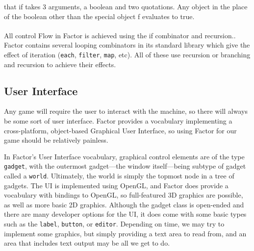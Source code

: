 \documentclass{sig-alternate}
\begin{document}
     that if takes 3 arguments, a boolean and two quotations. Any object in the place of the boolean other
      than the special object f evaluates to true.
\\\\
All control Flow in Factor is achieved using the if combinator and recursion.. 
Factor contains several looping combinators in its standard library which give the effect of iteration (\texttt{each}, \texttt{filter}, \texttt{map}, etc). All of these use recursion or branching
  and recursion to achieve their effects.
  
\subsection{User Interface}
Any game will require the user to interact with the machine, so there will always be some sort of user interface. Factor provides a vocabulary implementing a cross-platform, object-based Graphical User Interface, so using Factor for our game should be relatively painless.

In Factor's User Interface vocabulary, graphical control elements are of the type \texttt{gadget}, with the outermost gadget---the window itself---being subtype of gadget called a \texttt{world}. Ultimately, the world is simply the topmost node in a tree of gadgets. The UI is implemented using OpenGL, and Factor does provide a vocabulary with bindings to OpenGL, so full-featured 3D graphics are possible, as well as more basic 2D graphics. Although the gadget class is open-ended and there are many developer options for the UI, it does come with some basic types such as the \texttt{label}, \texttt{button}, or \texttt{editor}. Depending on time, we may try to implement some graphics, but simply providing a text area to read from, and an area that includes text output may be all we get to do.
\end{document}
